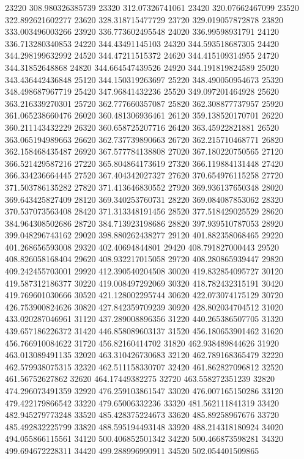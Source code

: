 {23220 308.980326385739
23320 312.07326741061
23420 320.07662467099
23520 322.892621602277
23620 328.318715477729
23720 329.019057872878
23820 333.003496003266
23920 336.773602495548
24020 336.99598931791
24120 336.713280340853
24220 344.43491145103
24320 344.593518687305
24420 344.298199632992
24520 344.47211515372
24620 344.415109314955
24720 344.31852648868
24820 344.664547439526
24920 344.191819824589
25020 343.436442436848
25120 344.150319263697
25220 348.490050954673
25320 348.498687967719
25420 347.96841432236
25520 349.097201464928
25620 363.216339270301
25720 362.777660357087
25820 362.308877737957
25920 361.065238660476
26020 360.481306936461
26120 359.138520170701
26220 360.211143432229
26320 360.658725207716
26420 363.45922821881
26520 363.065194989663
26620 362.737739890663
26720 362.215710468771
26820 362.158468435487
26920 367.577784138808
27020 367.180220750565
27120 366.521429587216
27220 365.804864173619
27320 366.119884131448
27420 366.334236664445
27520 367.404342027327
27620 370.654976115258
27720 371.503786135282
27820 371.413646830552
27920 369.936137650348
28020 369.643425827409
28120 369.340253760731
28220 369.084087853062
28320 370.537073563408
28420 371.313348191456
28520 377.518429025529
28620 384.964308502686
28720 384.713923198686
28820 397.939510787053
28920 399.048296743162
29020 398.880262438277
29120 401.882358068465
29220 401.268656593008
29320 402.40694844801
29420 408.791827000443
29520 408.826058168404
29620 408.932217015058
29720 408.280865939447
29820 409.242455703001
29920 412.390540204508
30020 419.832854095727
30120 419.587312186377
30220 419.008497292069
30320 418.782432315191
30420 419.769601030666
30520 421.128002295744
30620 422.073074175129
30720 426.753900824626
30820 427.842359709239
30920 428.802034704512
31020 433.020287046961
31120 437.289008896356
31220 440.265386507705
31320 439.657186226372
31420 446.858089603137
31520 456.180653901462
31620 456.766910084622
31720 456.82160414702
31820 462.938489844626
31920 463.013089491135
32020 463.310426730683
32120 462.789168365479
32220 462.579938075315
32320 462.511158330707
32420 461.862827096812
32520 461.56752627862
32620 464.17449382275
32720 463.558272351239
32820 474.296073491359
32920 476.259103861547
33020 476.007165150286
33120 479.422179866542
33220 479.65006332236
33320 481.562111841319
33420 482.945279773248
33520 485.428375224673
33620 485.89258967676
33720 485.492832225799
33820 488.595194493148
33920 488.214318180924
34020 494.055866115561
34120 500.406852501342
34220 500.466873598281
34320 499.694672228311
34420 499.288996990911
34520 502.054401509865
}
